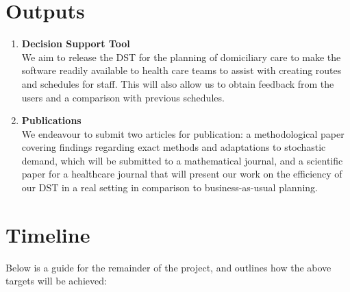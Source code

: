 \documentclass[a4paper]{article}
\begin{document}
\section*{Outputs}
\begin{enumerate}[leftmargin=*]
	\item \textbf{Decision Support Tool}\\
	We aim to release the DST for the planning of domiciliary care to make the software readily available to health care teams to assist with creating routes and schedules for staff. This will also allow us to obtain feedback from the users and a comparison with previous schedules.
	\item \textbf{Publications}\\
	We endeavour to submit two articles for publication: a methodological paper covering findings regarding exact methods and adaptations to stochastic demand, which will be submitted to a mathematical journal, and a scientific paper for a healthcare journal that will present our work on the efficiency of our DST in a real setting in comparison to business-as-usual planning. 
\end{enumerate}	



\section*{Timeline}
Below is a guide for the remainder of the project, and outlines how the above targets will be achieved:
\end{document}
